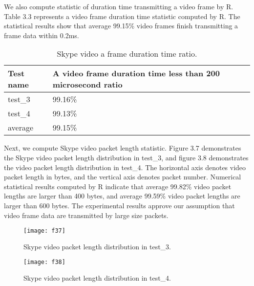 \documentclass[master]{thesis}
\begin{document}
We also compute statistic of duration time transmitting a video frame by R. Table 3.3 represents a video frame duration time statistic computed by R. The statistical results show that average 99.15\% video frames finish transmitting a frame data within 0.2ms.

\begin{table}[hp]
    \caption[Skype video a frame duration time ratio.]{Skype video a frame duration time ratio.}
    \label{table:t33}
    \begin{center}
        \begin{tabular}{@{}*{2}{l}} %
            \toprule %
          Test name	&A video frame duration time less than 200 microsecond ratio  \\
            \midrule %
		test\_3	&99.16\%  \\
		test\_4	&99.13\%  \\
		average	&99.15\%  \\
            \bottomrule %
        \end{tabular}
    \end{center}
\end{table}

Next, we compute Skype video packet length statistic. Figure 3.7 demonstrates the Skype video packet length distribution in test\_3, and figure 3.8 demonstrates the video packet length distribution in test\_4. The horizontal axis denotes video packet length in bytes, and the vertical axis denotes packet number. Numerical statistical results computed by R indicate that average 99.82\% video packet lengths are larger than 400 bytes, and average 99.59\% video packet lengths are larger than 600 bytes. The experimental results approve our assumption that video frame data are transmitted by large size packets. 

\begin{figure}[htp]
    \texttt{[image: f37]}
    \caption[Skype video packet length distribution in test\_3.]{Skype video packet length distribution in test\_3.}
    \label{fig:f37}
\end{figure}

\begin{figure}[htp]
    \texttt{[image: f38]}
    \caption[Skype video packet length distribution in test\_4.]{Skype video packet length distribution in test\_4.}
    \label{fig:f38}
\end{figure}
\end{document}
